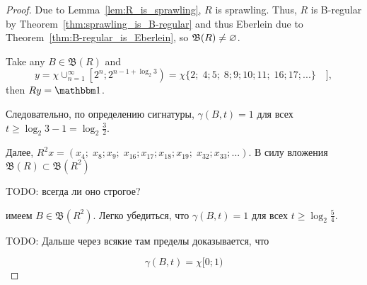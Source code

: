 \begin{proof}
	Due to Lemma~\ref{lem:R_is_sprawling}, $R$ is sprawling.
	Thus, $R$ is B-regular by Theorem~\ref{thm:sprawling_is_B-regular} and thus Eberlein due to Theorem~\ref{thm:B-regular_is_Eberlein},
	so $\mathfrak{B}(R)\ne \varnothing$.

	Take any $B \in \mathfrak{B}(R)$ and
	\begin{equation}
		y = \chi \cup_{n=1}^\infty \left[ 2^n; 2^{n-1+\log_2 3}\right) =
		\chi \{ 2; \; 4;5; \; 8;9;10;11; \; 16;17;... \}\quad]
		,
	\end{equation}
	then $Ry=\one$.

	Следовательно, по определению сигнатуры, $\gamma(B,t) = 1$ для всех $t \geq \log_2 3 - 1 = \log_2 \frac32$.

	Далее, $R^2 x = (x_4; \; x_8; x_9;\; x_{16}; x_{17}; x_{18}; x_{19}; \; x_{32}; x_{33};...)$.
	В силу вложения $\mathfrak{B}(R)\subset\mathfrak{B}(R^2)$

	TODO: всегда ли оно строгое?

	имеем $B\in\mathfrak{B}(R^2)$.
	Легко убедиться, что $\gamma(B,t) = 1$ для всех $t \geq \log_2 \frac54$.

	TODO: Дальше через всякие там пределы доказывается, что

	\begin{equation}
		\label{eq:gamma_chi_0_1}
		\gamma(B,t) = \chi{[}0;1)
	\end{equation}





\end{proof}
